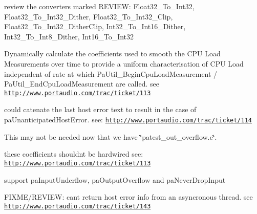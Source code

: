 \begin{DoxyRefList}
review the converters marked R\+E\+V\+I\+EW\+: Float32\+\_\+\+To\+\_\+\+Int32, Float32\+\_\+\+To\+\_\+\+Int32\+\_\+\+Dither, Float32\+\_\+\+To\+\_\+\+Int32\+\_\+\+Clip, Float32\+\_\+\+To\+\_\+\+Int32\+\_\+\+Dither\+Clip, Int32\+\_\+\+To\+\_\+\+Int16\+\_\+\+Dither, Int32\+\_\+\+To\+\_\+\+Int8\+\_\+\+Dither, Int16\+\_\+\+To\+\_\+\+Int32  
\item[\label{todo__todo000010}%
\hypertarget{todo__todo000010}{}%
File \hyperlink{pa__cpuload_8c}{pa\+\_\+cpuload.c} ]Dynamically calculate the coefficients used to smooth the C\+PU Load Measurements over time to provide a uniform characterisation of C\+PU Load independent of rate at which Pa\+Util\+\_\+\+Begin\+Cpu\+Load\+Measurement / Pa\+Util\+\_\+\+End\+Cpu\+Load\+Measurement are called. see \href{http://www.portaudio.com/trac/ticket/113}{\tt http\+://www.\+portaudio.\+com/trac/ticket/113}  
\item[\label{todo__todo000013}%
\hypertarget{todo__todo000013}{}%
Member \hyperlink{pa__front_8c_ae606855a611cf29c7d2d7421df5e3b5d}{Pa\+\_\+\+Get\+Error\+Text} (Pa\+Error error\+Code)]could catenate the last host error text to result in the case of pa\+Unanticipated\+Host\+Error. see\+: \href{http://www.portaudio.com/trac/ticket/114}{\tt http\+://www.\+portaudio.\+com/trac/ticket/114}  
\item[\label{todo__todo000042}%
\hypertarget{todo__todo000042}{}%
File \hyperlink{patest__toomanysines_8c}{patest\+\_\+toomanysines.c} ]This may not be needed now that we have \char`\"{}patest\+\_\+out\+\_\+overflow.\+c\char`\"{}.  
\item[\label{todo__todo000011}%
\hypertarget{todo__todo000011}{}%
Member \hyperlink{pa__cpuload_8h_a8c29cc1cf3b6fd9bf18a2c3fc9f0ef2a}{Pa\+Util\+\_\+\+End\+Cpu\+Load\+Measurement} (\hyperlink{struct_pa_util_cpu_load_measurer}{Pa\+Util\+Cpu\+Load\+Measurer} $\ast$measurer, unsigned long frames\+Processed)]these coefficients shouldn\textquotesingle{}t be hardwired see\+: \href{http://www.portaudio.com/trac/ticket/113}{\tt http\+://www.\+portaudio.\+com/trac/ticket/113}  
\item[\label{todo__todo000027}%
\hypertarget{todo__todo000027}{}%
Member \hyperlink{pa__win__wmme_8c_af8f8a8ef4c1f1a39686109801807a4ee}{Processing\+Thread\+Proc} (void $\ast$p\+Arg)]support pa\+Input\+Underflow, pa\+Output\+Overflow and pa\+Never\+Drop\+Input 

F\+I\+X\+M\+E/\+R\+E\+V\+I\+EW\+: can\textquotesingle{}t return host error info from an asyncronous thread. see \href{http://www.portaudio.com/trac/ticket/143}{\tt http\+://www.\+portaudio.\+com/trac/ticket/143} 


\end{DoxyRefList}
